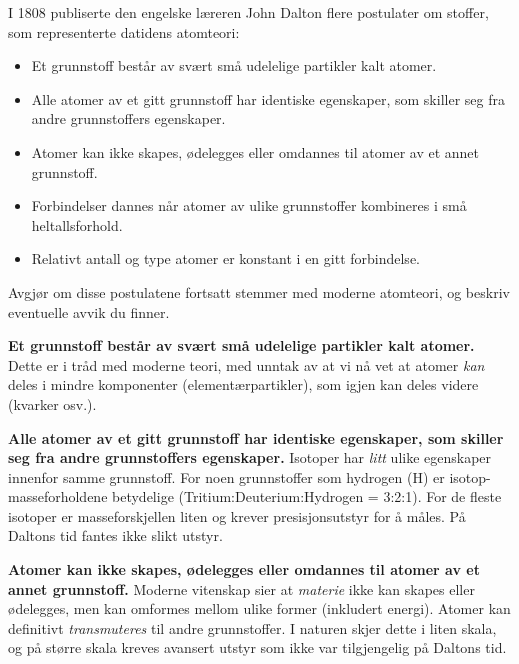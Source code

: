 

I 1808 publiserte den engelske læreren John Dalton flere postulater om stoffer, som representerte datidens atomteori:

\begin{itemize}
\item{} Et grunnstoff består av svært små udelelige partikler kalt atomer.
\item{} Alle atomer av et gitt grunnstoff har identiske egenskaper, som skiller seg fra andre grunnstoffers egenskaper.
\item{} Atomer kan ikke skapes, ødelegges eller omdannes til atomer av et annet grunnstoff.
\item{} Forbindelser dannes når atomer av ulike grunnstoffer kombineres i små heltallsforhold.
\item{} Relativt antall og type atomer er konstant i en gitt forbindelse.
\end{itemize} 

Avgjør om disse postulatene fortsatt stemmer med moderne atomteori, og beskriv eventuelle avvik du finner.







{\bf Et grunnstoff består av svært små udelelige partikler kalt atomer.} Dette er i tråd med moderne teori, med unntak av at vi nå vet at atomer {\it kan} deles i mindre komponenter (elementærpartikler), som igjen kan deles videre (kvarker osv.).

\vskip 10pt

{\bf Alle atomer av et gitt grunnstoff har identiske egenskaper, som skiller seg fra andre grunnstoffers egenskaper.} Isotoper har {\it litt} ulike egenskaper innenfor samme grunnstoff. For noen grunnstoffer som hydrogen (H) er isotop-masseforholdene betydelige (Tritium:Deuterium:Hydrogen = 3:2:1). For de fleste isotoper er masseforskjellen liten og krever presisjonsutstyr for å måles. På Daltons tid fantes ikke slikt utstyr.

\vskip 10pt

{\bf Atomer kan ikke skapes, ødelegges eller omdannes til atomer av et annet grunnstoff.} Moderne vitenskap sier at {\it materie} ikke kan skapes eller ødelegges, men kan omformes mellom ulike former (inkludert energi). Atomer kan definitivt {\it transmuteres} til andre grunnstoffer. I naturen skjer dette i liten skala, og på større skala kreves avansert utstyr som ikke var tilgjengelig på Daltons tid.

